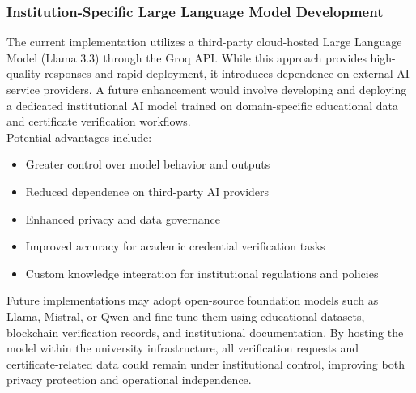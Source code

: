     \subsubsection{Institution-Specific Large Language Model Development}
    
    The current implementation utilizes a third-party cloud-hosted Large Language Model (Llama 3.3) through the Groq API. While this approach provides high-quality responses and rapid deployment, it introduces dependence on external AI service providers. A future enhancement would involve developing and deploying a dedicated institutional AI model trained on domain-specific educational data and certificate verification workflows.\\
    
    Potential advantages include:

    \begin{itemize}
        \item Greater control over model behavior and outputs
        
        \item Reduced dependence on third-party AI providers
        
        \item Enhanced privacy and data governance
        
        \item Improved accuracy for academic credential verification tasks
        
        \item Custom knowledge integration for institutional regulations and policies
    \end{itemize}
    
    Future implementations may adopt open-source foundation models such as Llama, Mistral, or Qwen and fine-tune them using educational datasets, blockchain verification records, and institutional documentation. By hosting the model within the university infrastructure, all verification requests and certificate-related data could remain under institutional control, improving both privacy protection and operational independence.\\